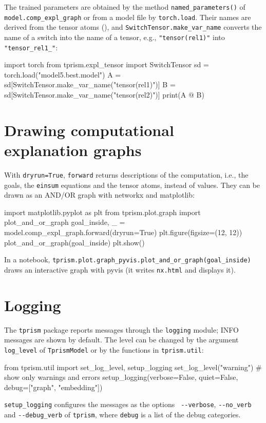 \documentclass[a4paper]{report}
\begin{document}
The trained parameters are obtained by the method {\tt named\_parameters()}
of {\tt model.comp\_expl\_graph} or from a model file by {\tt torch.load}.  Their names are derived from the tensor atoms
(), and {\tt SwitchTensor.make\_var\_name}
converts the name of a switch into the name of a tensor, e.g.,
{\tt "tensor(rel1)"} into {\tt "tensor\_rel1\_"}:
\begin{pythoncode}
import torch
from tprism.expl_tensor import SwitchTensor
sd = torch.load("model5.best.model")
A = sd[SwitchTensor.make_var_name("tensor(rel1)")]
B = sd[SwitchTensor.make_var_name("tensor(rel2)")]
print(A @ B)
\end{pythoncode}

\section{Drawing computational explanation graphs}
\label{sec:api_plot}

With {\tt dryrun=True}, {\tt forward} returns descriptions of the
computation, i.e., the goals, the {\tt einsum} equations and the tensor
atoms, instead of values.  They can be drawn as an AND/OR graph with
networkx and matplotlib:
\begin{pythoncode}
import matplotlib.pyplot as plt
from tprism.plot.graph import plot_and_or_graph
goal_inside, _ = model.comp_expl_graph.forward(dryrun=True)
plt.figure(figsize=(12, 12))
plot_and_or_graph(goal_inside)
plt.show()
\end{pythoncode}
In a notebook, {\tt tprism.plot.graph\_pyvis.plot\_and\_or\_graph(goal\_inside)}
draws an interactive graph with pyvis (it writes {\tt nx.html} and displays it).

\section{Logging}
\label{sec:api_logging}

The {\tt tprism} package reports messages through the {\tt logging}
module; INFO messages are shown by default.  The level can be changed by
the argument {\tt log\_level} of {\tt TprismModel} or by the functions
in {\tt tprism.util}:
\begin{pythoncode}
from tprism.util import set_log_level, setup_logging
set_log_level("warning")            # show only warnings and errors
setup_logging(verbose=False, quiet=False, debug=["graph", "embedding"])
\end{pythoncode}
{\tt setup\_logging} configures the messages as the options {\tt
	-{}-verbose}, {\tt -{}-no\_verb} and {\tt -{}-debug\_verb} of {\tt tprism},
where {\tt debug} is a list of the debug categories.
\end{document}
